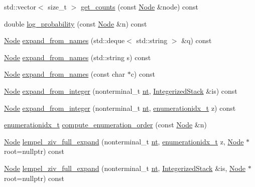 \begin{DoxyCompactItemize}
\item 
std\+::vector$<$ size\+\_\+t $>$ \hyperlink{class_grammar_ae0823f7af30a851a968dae46adbd49a5}{get\+\_\+counts} (const \hyperlink{class_node}{Node} \&node) const
\item 
double \hyperlink{class_grammar_a11f1788026f68e7ddb7fca1ec04915f5}{log\+\_\+probability} (const \hyperlink{class_node}{Node} \&n) const
\item 
\hyperlink{class_node}{Node} \hyperlink{class_grammar_ab5bd3d35545bcab4dbd3ca1d136bd4ce}{expand\+\_\+from\+\_\+names} (std\+::deque$<$ std\+::string $>$ \&q) const
\item 
\hyperlink{class_node}{Node} \hyperlink{class_grammar_a44954a36c11d58c23bef02ca7d541005}{expand\+\_\+from\+\_\+names} (std\+::string s) const
\item 
\hyperlink{class_node}{Node} \hyperlink{class_grammar_a0addff494602ebb19852c2d4314eaac6}{expand\+\_\+from\+\_\+names} (const char $\ast$c) const
\item 
\hyperlink{class_node}{Node} \hyperlink{class_grammar_a221f1a43488624ce78138d7d5045a816}{expand\+\_\+from\+\_\+integer} (nonterminal\+\_\+t \hyperlink{class_grammar_aa5c9afa0e7e1aa989b54402b02a677a3}{nt}, \hyperlink{class_integerized_stack}{Integerized\+Stack} \&is) const
\item 
\hyperlink{class_node}{Node} \hyperlink{class_grammar_a7b478d4ad5955b7489074e106afce5a4}{expand\+\_\+from\+\_\+integer} (nonterminal\+\_\+t \hyperlink{class_grammar_aa5c9afa0e7e1aa989b54402b02a677a3}{nt}, \hyperlink{_numerics_8h_a9fe2bbca873b046b2bd276fc6856bb88}{enumerationidx\+\_\+t} z) const
\item 
\hyperlink{_numerics_8h_a9fe2bbca873b046b2bd276fc6856bb88}{enumerationidx\+\_\+t} \hyperlink{class_grammar_ab6970c88fc6f5ed56020fe0dfac302f4}{compute\+\_\+enumeration\+\_\+order} (const \hyperlink{class_node}{Node} \&n)
\item 
\hyperlink{class_node}{Node} \hyperlink{class_grammar_a607aa205d57a1b61b07f9ef57adcf697}{lempel\+\_\+ziv\+\_\+full\+\_\+expand} (nonterminal\+\_\+t \hyperlink{class_grammar_aa5c9afa0e7e1aa989b54402b02a677a3}{nt}, \hyperlink{_numerics_8h_a9fe2bbca873b046b2bd276fc6856bb88}{enumerationidx\+\_\+t} z, \hyperlink{class_node}{Node} $\ast$root=nullptr) const
\item 
\hyperlink{class_node}{Node} \hyperlink{class_grammar_a98fd19c7b9c1d92c59365a693ec12547}{lempel\+\_\+ziv\+\_\+full\+\_\+expand} (nonterminal\+\_\+t \hyperlink{class_grammar_aa5c9afa0e7e1aa989b54402b02a677a3}{nt}, \hyperlink{class_integerized_stack}{Integerized\+Stack} \&is, \hyperlink{class_node}{Node} $\ast$root=nullptr) const

\end{DoxyCompactItemize}
